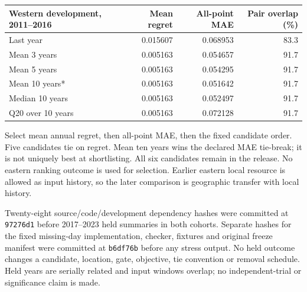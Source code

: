 \documentclass[10pt,letterpaper]{article}
\begin{document}
\begin{center}\small\begin{tabular}{lrrr}\toprule
Western development, 2011--2016 & Mean regret & All-point MAE & Pair overlap (\%)\\\midrule
Last year & 0.015607 & 0.068953 & 83.3 \\
Mean 3 years & 0.005163 & 0.054657 & 91.7 \\
Mean 5 years & 0.005163 & 0.054295 & 91.7 \\
Mean 10 years* & 0.005163 & 0.051642 & 91.7 \\
Median 10 years & 0.005163 & 0.052497 & 91.7 \\
Q20 over 10 years & 0.005163 & 0.072128 & 91.7 \\
\bottomrule\end{tabular}\end{center}
Select mean annual regret, then all-point MAE, then the fixed candidate order. Five candidates tie on regret. Mean ten years wins the declared MAE tie-break; it is not uniquely best at shortlisting. All six candidates remain in the release. No eastern ranking outcome is used for selection. Earlier eastern local resource is allowed as input history, so the later comparison is geographic transfer with local history.

Twenty-eight source/code/development dependency hashes were committed at \texttt{97276d1} before 2017--2023 held summaries in both cohorts. Separate hashes for the fixed missing-day implementation, checker, fixtures and original freeze manifest were committed at \texttt{b6df76b} before any stress output. No held outcome changes a candidate, location, gate, objective, tie convention or removal schedule. Held years are serially related and input windows overlap; no independent-trial or significance claim is made.
\newpage
\end{document}
